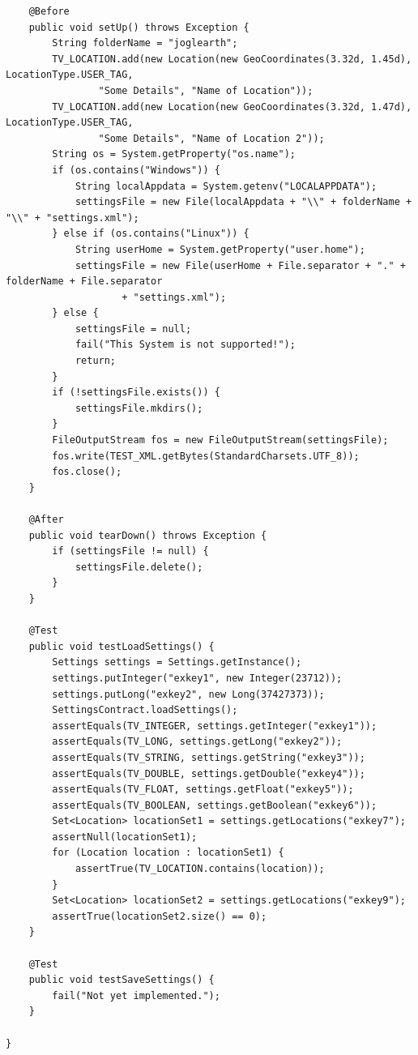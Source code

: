 \documentclass[10pt]{scrreprt}
\begin{document}
\begin{lstlisting}
    @Before
    public void setUp() throws Exception {
        String folderName = "joglearth";
        TV_LOCATION.add(new Location(new GeoCoordinates(3.32d, 1.45d), LocationType.USER_TAG,
                "Some Details", "Name of Location"));
        TV_LOCATION.add(new Location(new GeoCoordinates(3.32d, 1.47d), LocationType.USER_TAG,
                "Some Details", "Name of Location 2"));
        String os = System.getProperty("os.name");
        if (os.contains("Windows")) {
            String localAppdata = System.getenv("LOCALAPPDATA");
            settingsFile = new File(localAppdata + "\\" + folderName + "\\" + "settings.xml");
        } else if (os.contains("Linux")) {
            String userHome = System.getProperty("user.home");
            settingsFile = new File(userHome + File.separator + "." + folderName + File.separator
                    + "settings.xml");
        } else {
            settingsFile = null;
            fail("This System is not supported!");
            return;
        }
        if (!settingsFile.exists()) {
            settingsFile.mkdirs();
        }
        FileOutputStream fos = new FileOutputStream(settingsFile);
        fos.write(TEST_XML.getBytes(StandardCharsets.UTF_8));
        fos.close();
    }

    @After
    public void tearDown() throws Exception {
        if (settingsFile != null) {
            settingsFile.delete();
        }
    }

    @Test
    public void testLoadSettings() {
        Settings settings = Settings.getInstance();
        settings.putInteger("exkey1", new Integer(23712));
        settings.putLong("exkey2", new Long(37427373));
        SettingsContract.loadSettings();
        assertEquals(TV_INTEGER, settings.getInteger("exkey1"));
        assertEquals(TV_LONG, settings.getLong("exkey2"));
        assertEquals(TV_STRING, settings.getString("exkey3"));
        assertEquals(TV_DOUBLE, settings.getDouble("exkey4"));
        assertEquals(TV_FLOAT, settings.getFloat("exkey5"));
        assertEquals(TV_BOOLEAN, settings.getBoolean("exkey6"));
        Set<Location> locationSet1 = settings.getLocations("exkey7");
        assertNull(locationSet1);
        for (Location location : locationSet1) {
            assertTrue(TV_LOCATION.contains(location));
        }
        Set<Location> locationSet2 = settings.getLocations("exkey9");
        assertTrue(locationSet2.size() == 0); 
    }

    @Test
    public void testSaveSettings() {
        fail("Not yet implemented.");
    }

}

\end{lstlisting}
\end{document}
